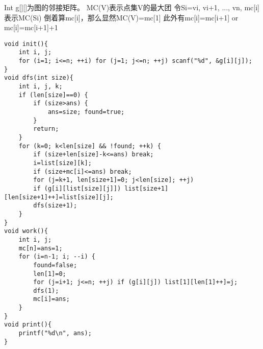 Int g[][]为图的邻接矩阵。
	MC(V)表示点集V的最大团
	令Si={vi, vi+1, ..., vn}, mc[i]表示MC(Si)
	倒着算mc[i]，那么显然MC(V)=mc[1]
	此外有mc[i]=mc[i+1] or mc[i]=mc[i+1]+1
	\begin{lstlisting}
void init(){
	int i, j;
	for (i=1; i<=n; ++i) for (j=1; j<=n; ++j) scanf("%d", &g[i][j]);
}
void dfs(int size){
	int i, j, k;
	if (len[size]==0) {
		if (size>ans) {
			ans=size; found=true;
		}
		return;
	}
	for (k=0; k<len[size] && !found; ++k) {
		if (size+len[size]-k<=ans) break;
		i=list[size][k];
		if (size+mc[i]<=ans) break;
		for (j=k+1, len[size+1]=0; j<len[size]; ++j)
		if (g[i][list[size][j]]) list[size+1][len[size+1]++]=list[size][j];
		dfs(size+1);
	}
}
void work(){
	int i, j;
	mc[n]=ans=1;
	for (i=n-1; i; --i) {
		found=false;
		len[1]=0;
		for (j=i+1; j<=n; ++j) if (g[i][j]) list[1][len[1]++]=j;
		dfs(1);
		mc[i]=ans;
	}
}
void print(){
	printf("%d\n", ans);
}
	\end{lstlisting}
